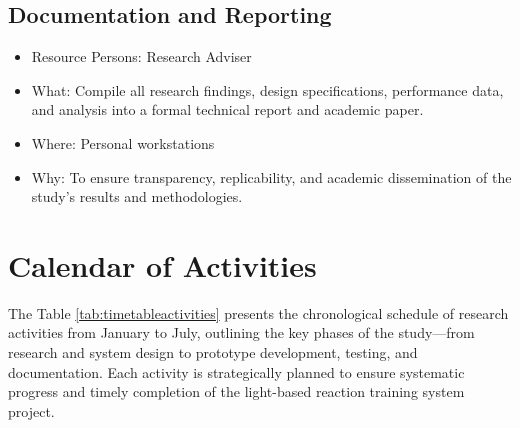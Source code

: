 \subsection{Documentation and Reporting}
\begin{itemize}
	\item Resource Persons: Research Adviser
	\item What: Compile all research findings, design specifications, performance data, and analysis into a formal technical report and academic paper.
	\item Where: Personal workstations
	\item Why: To ensure transparency, replicability, and academic dissemination of the study’s results and methodologies.
\end{itemize}

\section{Calendar of Activities}

The Table \ref{tab:timetableactivities} presents the chronological schedule of research activities from January to July, outlining the key phases of the study—from research and system design to prototype development, testing, and documentation. Each activity is strategically planned to ensure systematic progress and timely completion of the light-based reaction training system project.

%
%
\newcommand{\weekone}{\textbullet}
\newcommand{\weektwo}{\textbullet \textbullet}
\newcommand{\weekthree}{\textbullet \textbullet \textbullet}
\newcommand{\weekfour}{\textbullet \textbullet \textbullet \textbullet}

%
%
\begin{comment}
   \newcommand{\weekone}{$\star$}
   \newcommand{\weektwo}{$\star \star$}
   \newcommand{\weekthree}{$\star \star \star$}
   \newcommand{\weekfour}{$\star \star \star \star$ }
\end{comment}



